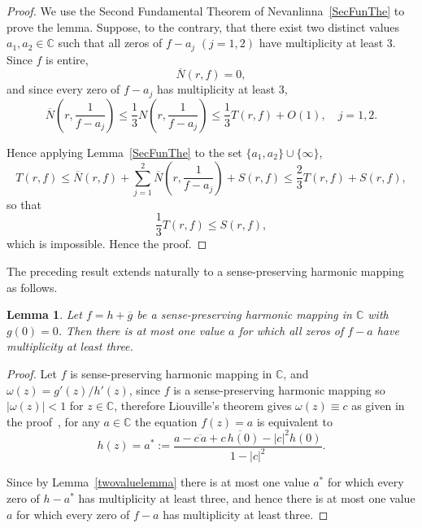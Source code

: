 \documentclass[11pt, reqno]{amsart}
\numberwithin{equation}{section}
\theoremstyle{definition}
\theoremstyle{remark}
\theoremstyle{plain}
\newtheorem{lemma}[definition]{Lemma}
\begin{document}
\begin{proof}
We use the Second Fundamental Theorem of 
Nevanlinna~\ref{SecFunThe} to prove the lemma. Suppose, to the
contrary, that there exist two distinct values
$a_1, a_2\in\mathbb{C}$ such that all zeros of
$f-a_j$ $(j=1,2)$ have multiplicity at least $3$. Since $f$ is
entire,
\[
\overline{N}(r,f)=0,
\]
and since every zero of $f-a_j$ has multiplicity at least 3,
\[
\overline{N}\!\left(r,\frac{1}{f-a_j}\right)
\leq
\frac{1}{3}
N\!\left(r,\frac{1}{f-a_j}\right)
\leq
\frac{1}{3}T(r,f)+O(1), \quad j=1,2.
\]

Hence applying Lemma~\ref{SecFunThe} to the set 
$\{a_1,a_2\}\cup\{\infty\}$,
\[
T(r,f)
\leq
\overline{N}(r,f)
+\sum_{j=1}^{2}
\overline{N}\!\left(r,\frac{1}{f-a_j}\right)
+S(r,f)
\leq
\frac{2}{3}T(r,f)+S(r,f),
\]
so that
\[
\frac{1}{3}T(r,f)\leq S(r,f),
\]
which is impossible. Hence the proof.
\end{proof}

The preceding result extends naturally to a
sense-preserving harmonic mapping as follows.
\begin{lemma}\label{twovalueharmonic}
  Let $f=h+\overline{g}$ be a sense-preserving harmonic mapping in
$\mathbb{C}$ with $g(0)=0$. Then there is at most one value $a$
for which all zeros of $f-a$ have multiplicity at least three.
\end{lemma}


\begin{proof}
Let $f$ is sense-preserving harmonic mapping in $\mathbb{C}$,
 and $\omega(z)=g'(z)/h'(z)$, since $f$ is a sense-preserving harmonic 
mapping so $|\omega(z)|<1$ for $z\in\mathbb{C}$, 
therefore Liouville's theorem gives
$\omega(z)\equiv c$ as given in the proof~\cite[Lemma~2.5]{Bohra}, 
for any $a\in\mathbb{C}$ the equation
$f(z)=a$ is equivalent to
\begin{equation}\label{eq: hequivf}
h(z)=a^{*}:=
\frac{a-\overline{c\,a}
+\overline{c\,h(0)}-|c|^{2}h(0)}
{1-|c|^{2}}.
\end{equation}


Since by Lemma~\ref{twovaluelemma} there is at most
one value $a^{*}$ for which every zero of $h-a^{*}$ has 
multiplicity at least three, and hence there
is at most one value $a$ for which every zero of $f-a$
 has multiplicity at least three.
\end{proof}
\end{document}
